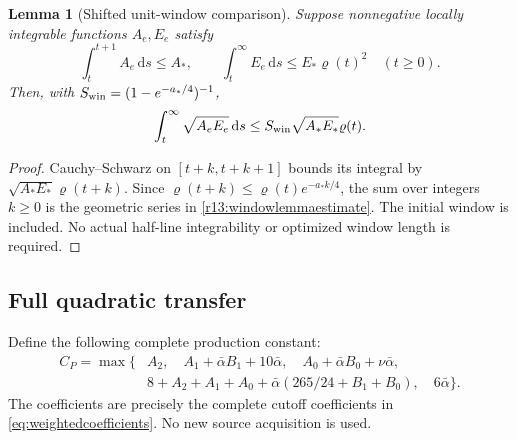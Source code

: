 \documentclass[11pt]{article}
\numberwithin{equation}{section}
\newtheorem{lemma}[theorem]{Lemma}
\newcommand{\dd}{\,\mathrm d}
\begin{document}
\begin{lemma}[Shifted unit-window comparison]\label{r13:windowlemma}
Suppose nonnegative locally integrable functions $A_e,E_e$ satisfy
\[
 \int_t^{t+1}A_e\dd s\le A_*,\qquad
 \int_t^\infty E_e\dd s\le E_*\varrho(t)^2
 \quad(t\ge0).
\]
Then, with $S_{\rm win}=(1-e^{-a_*/4})^{-1}$,
\begin{equation}\label{r13:windowlemmaestimate}
 \int_t^\infty\sqrt{A_eE_e}\dd s
        \le S_{\rm win}\sqrt{A_*E_*}\varrho(t).
\end{equation}
\end{lemma}
\begin{proof}
Cauchy--Schwarz on $[t+k,t+k+1]$ bounds its integral by
$\sqrt{A_*E_*}\varrho(t+k)$. Since
$\varrho(t+k)\le\varrho(t)e^{-a_*k/4}$, the sum over integers
$k\ge0$ is the geometric series in \eqref{r13:windowlemmaestimate}.
The initial window is included. No actual half-line integrability or
optimized window length is required.
\end{proof}

\subsection{Full quadratic transfer}

Define the following complete production constant:
\begin{equation}\label{r13:productionconstant}
 \begin{split}
 C_P=\max\big\{&A_2,\quad A_1+\bar\alpha B_1+10\bar\alpha,
       \quad A_0+\bar\alpha B_0+\nu\bar\alpha,\\
 &8+A_2+A_1+A_0+\bar\alpha(265/24+B_1+B_0),
       \quad6\bar\alpha\big\}.
 \end{split}
\end{equation}
The coefficients are precisely the complete cutoff coefficients in
\eqref{eq:weightedcoefficients}. No new source acquisition is used.
\end{document}
